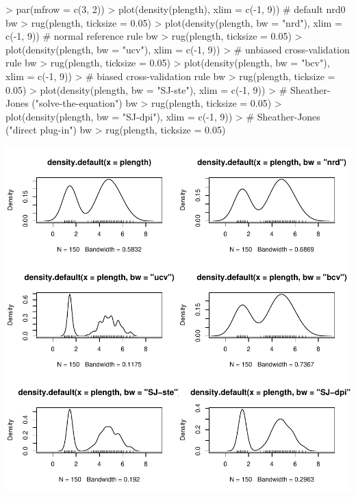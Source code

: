 \begin{Schunk}
\begin{Sinput}
> par(mfrow = c(3, 2))
> plot(density(plength), xlim = c(-1, 9))                # default nrd0 bw
> rug(plength, ticksize = 0.05)
> plot(density(plength, bw = "nrd"), xlim = c(-1, 9))    # normal reference rule bw
> rug(plength, ticksize = 0.05)
> plot(density(plength, bw = "ucv"), xlim = c(-1, 9))    
>                                    # unbiased cross-validation rule bw
> rug(plength, ticksize = 0.05)
> plot(density(plength, bw = "bcv"), xlim = c(-1, 9))    
>                                    # biased cross-validation rule bw
> rug(plength, ticksize = 0.05)
> plot(density(plength, bw = "SJ-ste"), xlim = c(-1, 9)) 
>                                    # Sheather-Jones ("solve-the-equation") bw
> rug(plength, ticksize = 0.05)
> plot(density(plength, bw = "SJ-dpi"), xlim = c(-1, 9)) 
>                                    # Sheather-Jones ("direct plug-in") bw
> rug(plength, ticksize = 0.05)
\end{Sinput}
\end{Schunk}
\includegraphics{lect_chapter5_v2-027}


